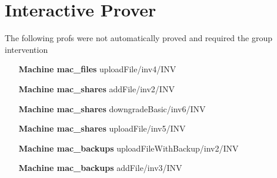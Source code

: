 \documentclass[paper=a4, fontsize=11pt]{scrartcl} %
\numberwithin{equation}{section} %
\numberwithin{figure}{section} %
\numberwithin{table}{section} %
\begin{document}
\section{Interactive Prover}
The following profs were not automatically proved and required the group intervention
\begin{itemize}
	\item[\textbf{Machine mac\_files}] uploadFile/inv4/INV
	\item[\textbf{Machine mac\_shares}] addFile/inv2/INV
	\item[\textbf{Machine mac\_shares}] downgradeBasic/inv6/INV
	\item[\textbf{Machine mac\_shares}] uploadFile/inv5/INV
	\item[\textbf{Machine mac\_backups}] uploadFileWithBackup/inv2/INV
	\item[\textbf{Machine mac\_backups}] addFile/inv3/INV
\end{itemize}
\end{document}
